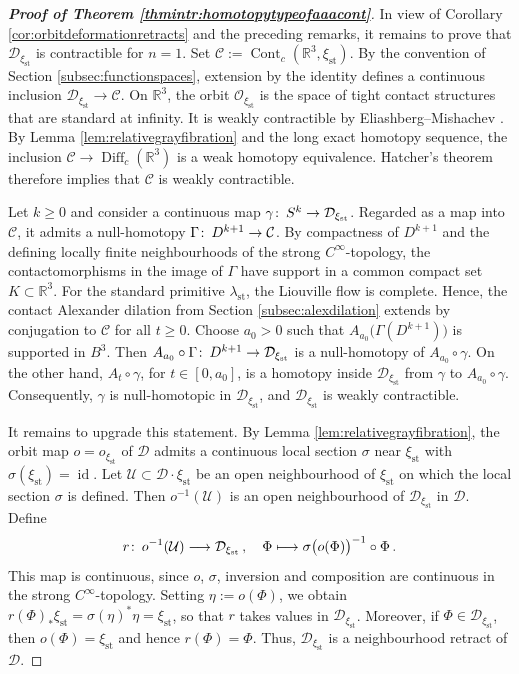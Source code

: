 \documentclass{amsart}
\theoremstyle{definition}
\def\co{\colon\thinspace}
\newcommand{\CC}{\mathcal C}
\newcommand{\DD}{\mathcal D}
\newcommand{\OO}{\mathcal O}
\newcommand{\R}{\mathbb R}
\newcommand{\UU}{\mathcal U}
\newcommand{\lra}{\longrightarrow}
\newcommand{\ra}{\rightarrow}
\DeclareMathOperator{\Diff}{\mathrm{Diff}}
\DeclareMathOperator{\id}{\mathrm{id}}
\DeclareMathOperator{\st}{\mathrm{st}}
\begin{document}
\begin{proof}[{\bf Proof of Theorem
\ref{thmintr:homotopytypeofaaacont}}]
In view of Corollary \ref{cor:orbitdeformationretracts}
and the preceding remarks,
it remains to prove that
$\DD_{\xi_{\st}}$ is contractible for $n=1$.
Set $\CC:=\operatorname{Cont}_c(\R^3,\xi_{\st})$.
By the convention of Section \ref{subsec:functionspaces},
extension by the identity defines a continuous inclusion
$\DD_{\xi_{\st}}\ra\CC$.
On $\R^3$, the orbit $\OO_{\xi_{\st}}$
is the space of tight contact structures
that are standard at infinity.
It is weakly contractible by
Eliashberg--Mishachev
\cite[Theorem~1.1]{em}.
By Lemma \ref{lem:relativegrayfibration}
and the long exact homotopy sequence,
the inclusion $\CC\ra\Diff_c(\R^3)$
is a weak homotopy equivalence.
Hatcher's theorem \cite{hat83}
therefore implies that $\CC$ is weakly contractible.

Let $k\geq0$ and consider a continuous map
$\gamma\co S^k\ra\DD_{\xi_{\st}}$.
Regarded as a map into $\CC$,
it admits a null-homotopy
$\Gamma\co D^{k+1}\ra\CC$.
By compactness of $D^{k+1}$
and the defining locally finite neighbourhoods
of the strong $C^{\infty}$-topology,
the contactomorphisms in the image of $\Gamma$
have support in a common compact set $K\subset\R^3$.
For the standard primitive $\lambda_{\st}$,
the Liouville flow is complete.
Hence, the contact Alexander dilation from
Section \ref{subsec:alexdilation}
extends by conjugation to $\CC$
for all $t\geq0$.
Choose $a_0>0$ such that
$A_{a_0}\big(\Gamma(D^{k+1})\big)$
is supported in $B^3$.
Then
$A_{a_0}\circ\Gamma\co D^{k+1}\ra\DD_{\xi_{\st}}$
is a null-homotopy of $A_{a_0}\circ\gamma$.
On the other hand,
$A_t\circ\gamma$, for $t\in[0,a_0]$,
is a homotopy inside $\DD_{\xi_{\st}}$
from $\gamma$ to $A_{a_0}\circ\gamma$.
Consequently,
$\gamma$ is null-homotopic in $\DD_{\xi_{\st}}$,
and $\DD_{\xi_{\st}}$ is weakly contractible.

It remains to upgrade this statement.
By Lemma \ref{lem:relativegrayfibration},
the orbit map $o=o_{\xi_{\st}}$ of $\DD$
admits a continuous local section $\sigma$
near $\xi_{\st}$ with $\sigma(\xi_{\st})=\id$.
Let $\UU\subset\DD\cdot\xi_{\st}$
be an open neighbourhood of $\xi_{\st}$
on which the local section $\sigma$ is defined.
Then $o^{-1}(\UU)$ is an open neighbourhood
of $\DD_{\xi_{\st}}$ in $\DD$.
Define
\[
r\co
o^{-1}(\UU)\lra\DD_{\xi_{\st}}
\,,
\quad
\Phi\longmapsto
\sigma\big(o(\Phi)\big)^{-1}\circ\Phi
\,.
\]
This map is continuous,
since $o$, $\sigma$, inversion and composition
are continuous in the strong $C^\infty$-topology.
Setting $\eta:=o(\Phi)$, we obtain
$r(\Phi)_*\xi_{\st}=\sigma(\eta)^*\eta=\xi_{\st}$,
so that $r$ takes values in $\DD_{\xi_{\st}}$.
Moreover, if $\Phi\in\DD_{\xi_{\st}}$, then
$o(\Phi)=\xi_{\st}$ and hence $r(\Phi)=\Phi$.
Thus, $\DD_{\xi_{\st}}$ is a neighbourhood retract
of $\DD$.


\end{proof}
\end{document}
